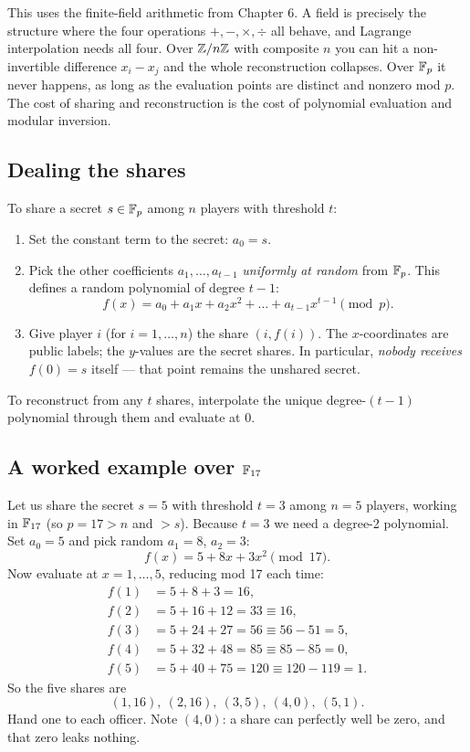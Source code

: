\begin{connectionbox}
This uses the finite-field arithmetic from Chapter 6. A field is precisely the structure where the four operations $+,-,\times,\div$ all behave, and Lagrange interpolation needs all four. Over $\mathbb{Z}/n\mathbb{Z}$ with composite $n$ you can hit a non-invertible difference $x_i - x_j$ and the whole reconstruction collapses. Over $\mathbb{F}_p$ it never happens, as long as the evaluation points are distinct and nonzero mod $p$. The cost of sharing and reconstruction is the cost of polynomial evaluation and modular inversion.
\end{connectionbox}

\subsection{Dealing the shares}
\label{ch32:deal}

To share a secret $s \in \mathbb{F}_p$ among $n$ players with threshold $t$:

\begin{enumerate}
  \item Set the constant term to the secret: $a_0 = s$.
  \item Pick the other coefficients $a_1, \dots, a_{t-1}$ \emph{uniformly at random} from $\mathbb{F}_p$. This defines a random polynomial of degree $t-1$:
  \[
    f(x) = a_0 + a_1 x + a_2 x^2 + \dots + a_{t-1}x^{t-1} \pmod p .
  \]
  \item Give player $i$ (for $i = 1, \dots, n$) the share $(i, f(i))$. The $x$-coordinates are public labels; the $y$-values are the secret shares. In particular, \emph{nobody receives} $f(0) = s$ itself --- that point remains the unshared secret.
\end{enumerate}

To reconstruct from any $t$ shares, interpolate the unique degree-$(t-1)$ polynomial through them and evaluate at $0$.

\subsection{A worked example over $\mathbb{F}_{17}$}
\label{ch32:worked}

Let us share the secret $s = 5$ with threshold $t = 3$ among $n = 5$ players, working in $\mathbb{F}_{17}$ (so $p = 17 > n$ and $> s$). Because $t = 3$ we need a degree-2 polynomial. Set $a_0 = 5$ and pick random $a_1 = 8$, $a_2 = 3$:
\[
  f(x) = 5 + 8x + 3x^2 \pmod{17}.
\]
Now evaluate at $x = 1, \dots, 5$, reducing mod 17 each time:
\[
\begin{aligned}
f(1) &= 5 + 8 + 3 = 16, \\
f(2) &= 5 + 16 + 12 = 33 \equiv 16, \\
f(3) &= 5 + 24 + 27 = 56 \equiv 56 - 51 = 5, \\
f(4) &= 5 + 32 + 48 = 85 \equiv 85 - 85 = 0, \\
f(5) &= 5 + 40 + 75 = 120 \equiv 120 - 119 = 1.
\end{aligned}
\]
So the five shares are
\[
  (1,16),\ (2,16),\ (3,5),\ (4,0),\ (5,1).
\]
Hand one to each officer. Note $(4,0)$: a share can perfectly well be zero, and that zero leaks nothing.


